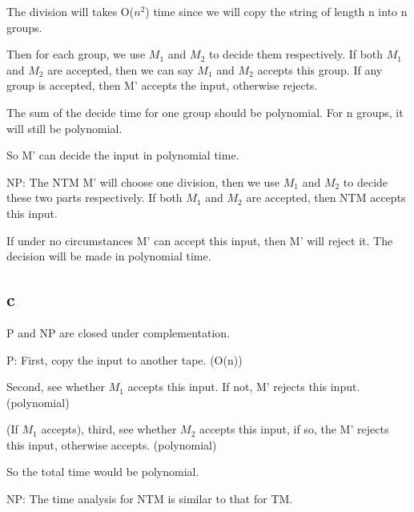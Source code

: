 \documentclass[a4paper,UTF8]{ctexart}
\theoremstyle{definition}
\begin{document}
The division will takes O($n^2$) time since we will copy the string of length n into n groups.

Then for each group, we use $M_1$ and $M_2$ to decide them respectively. If both $M_1$ and $M_2$ are 
accepted, then we can say $M_1$ and $M_2$ accepts this group. If any group is accepted, then M' accepts 
the input, otherwise rejects.

The sum of the decide time for one group should be polynomial. For n groups, it will still be polynomial.

So M' can decide the input in polynomial time.

NP: The NTM M' will choose one division, 
then we use $M_1$ and $M_2$ to decide these two parts respectively. 
If both $M_1$ and $M_2$ are 
accepted, then NTM accepts this input.

If under no circumstances M' can accept this input, then M' will reject it.
The decision will be made in polynomial time.


\subsection*{c}
P and NP are closed under complementation. 

P:
First, copy the input to another tape. (O(n))

Second, see whether $M_1$ accepts this input. If not, M' rejects this input. (polynomial)

(If $M_1$ accepts), third, see whether $M_2$ accepts this input,
if so, the M' rejects this input, otherwise accepts. (polynomial)

So the total time would be polynomial.

NP:
The time analysis for NTM is similar to that for TM.
\end{document}

